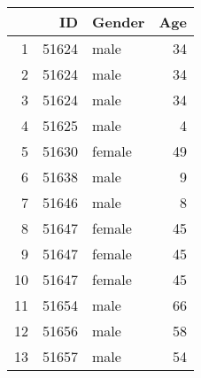 \documentclass{article}
\begin{document}
\begin{table}[ht]
\centering
\begin{tabular}{rrlr}
  \hline
 & ID & Gender & Age \\ 
  \hline
1 & 51624 & male &  34 \\ 
  2 & 51624 & male &  34 \\ 
  3 & 51624 & male &  34 \\ 
  4 & 51625 & male &   4 \\ 
  5 & 51630 & female &  49 \\ 
  6 & 51638 & male &   9 \\ 
  7 & 51646 & male &   8 \\ 
  8 & 51647 & female &  45 \\ 
  9 & 51647 & female &  45 \\ 
  10 & 51647 & female &  45 \\ 
  11 & 51654 & male &  66 \\ 
  12 & 51656 & male &  58 \\ 
  13 & 51657 & male &  54 \\ 
   \hline
\end{tabular}
\end{table}
\end{document}
